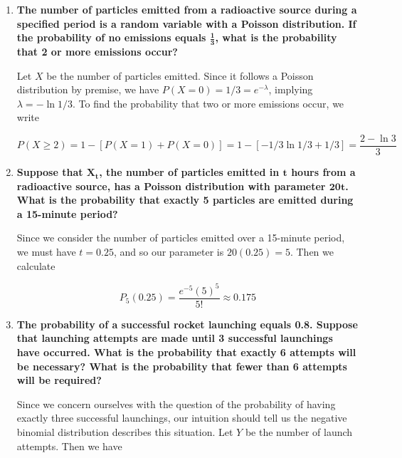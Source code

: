 \documentclass[10pt, oneside]{article}   	%
\theoremstyle{definition}
\begin{document}
\begin{enumerate}[label=8.\arabic*]
\begin{proof}
\end{proof}

\item  \begin{tcolorbox}[
  colback=Cerulean!5!white,
  colframe=Cerulean!75!black]
\textbf{The number of particles emitted from a radioactive source during a specified period is a random variable with a Poisson distribution. If the probability of no emissions equals $\bm{\frac{1}{3}}$, what is the probability that 2 or more emissions occur?}
\end{tcolorbox}

Let $X$ be the number of particles emitted. Since it follows a Poisson distribution by premise, we have $P(X = 0) = 1/3 = e^{-\lambda}$, implying $\lambda = - \ln 1/3$. To find the probability that two or more emissions occur, we write

\[ P(X \geq 2) = 1 - [P(X = 1) + P(X = 0)] = 1 - [-1/3 \ln 1/3 + 1/3] = \boxed{\frac{2 - \ln 3}{3} } \]

\item  \begin{tcolorbox}[
  colback=Cerulean!5!white,
  colframe=Cerulean!75!black]
\textbf{Suppose that $\bm{X_t}$, the number of particles emitted in $\bm{t}$ hours from a radioactive source, has a Poisson distribution with parameter $\bm{20t}$. What is the probability that exactly 5 particles are emitted during a 15-minute period?}
\end{tcolorbox}

Since we consider the number of particles emitted over a 15-minute period, we must have $t = 0.25$, and so our parameter is $20(0.25) = 5$. Then we calculate

\[ P_5 (0.25) = \frac{e^{-5} (5)^5 }{5!} \approx \boxed{0.175} \]

\item  \begin{tcolorbox}[
  colback=Cerulean!5!white,
  colframe=Cerulean!75!black]
\textbf{The probability of a successful rocket launching equals 0.8. Suppose that launching attempts are made until 3 successful launchings have occurred. What is the probability that exactly 6 attempts will be necessary? What is the probability that fewer than 6 attempts will be required?}
\end{tcolorbox}

Since we concern ourselves with the question of the probability of having exactly three successful launchings, our intuition should tell us the negative binomial distribution describes this situation. Let $Y$ be the number of launch attempts. Then we have


\end{enumerate}
\end{document}
